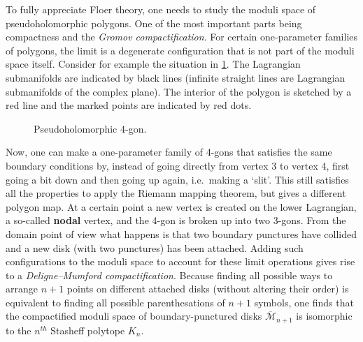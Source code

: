     \begin{property}
        To fully appreciate Floer theory, one needs to study the moduli space of pseudoholomorphic polygons. One of the most important parts being compactness and the \textit{Gromov compactification}. For certain one-parameter families of polygons, the limit is a degenerate configuration that is not part of the moduli space itself. Consider for example the situation in \cref{fig:floer_breaking}. The Lagrangian submanifolds are indicated by black lines (infinite straight lines are Lagrangian submanifolds of the complex plane). The interior of the polygon is sketched by a red line and the marked points are indicated by red dots.

        \begin{figure}[ht!]
            \centering
            \caption{Pseudoholomorphic 4-gon.}
            \label{fig:floer_breaking}
        \end{figure}
        Now, one can make a one-parameter family of 4-gons that satisfies the same boundary conditions by, instead of going directly from vertex 3 to vertex 4, first going a bit down and then going up again, i.e.~making a `slit'. This still satisfies all the properties to apply the Riemann mapping theorem, but gives a different polygon map. At a certain point a new vertex is created on the lower Lagrangian, a so-called \textbf{nodal} vertex, and the 4-gon is broken up into two 3-gons. From the domain point of view what happens is that two boundary punctures have collided and a new disk (with two punctures) has been attached. Adding such configurations to the moduli space to account for these limit operations gives rise to a \textit{Deligne--Mumford compactification}. Because finding all possible ways to arrange $n+1$ points on different attached disks (without altering their order) is equivalent to finding all possible parenthesations of $n+1$ symbols, one finds that the compactified moduli space of boundary-punctured disks $\overline{\mathcal{M}}_{n+1}$ is isomorphic to the $n^{th}$ Stasheff polytope $K_n$.


\end{property}
